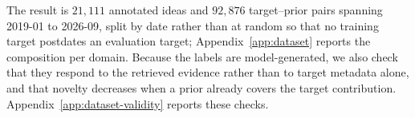 The result is $21{,}111$ annotated ideas and $92{,}876$ target--prior pairs
spanning 2019-01 to 2026-09, split by date rather than at random so that no
training target postdates an evaluation target;
Appendix~\ref{app:dataset} reports the composition per domain.
Because the labels are model-generated, we also check that they respond to
the retrieved evidence rather than to target metadata alone, and that novelty
decreases when a prior already covers the target contribution.
Appendix~\ref{app:dataset-validity} reports these checks.
